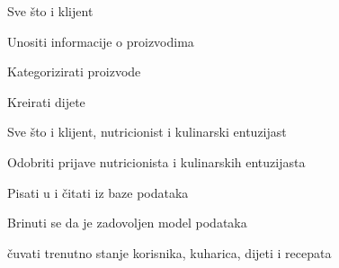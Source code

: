 \begin{packed_enum}
				\item  {}
				
				\begin{packed_enum}
					
					\item Sve što i klijent
					\item Unositi informacije o proizvodima
					\item Kategorizirati proizvode
					\item Kreirati dijete
					
				\end{packed_enum}

				\item  {}
				
				\begin{packed_enum}
					
					\item Sve što i klijent, nutricionist i kulinarski entuzijast
					\item Odobriti prijave nutricionista i kulinarskih entuzijasta
					\item Pisati u i čitati iz baze podataka
					
				\end{packed_enum}

				\item  {}
	
				\begin{packed_enum}
					
					\item Brinuti se da je zadovoljen model podataka
					\item čuvati trenutno stanje korisnika, kuharica, dijeti i recepata
					
				\end{packed_enum}
			\end{packed_enum}
			
			\eject 

